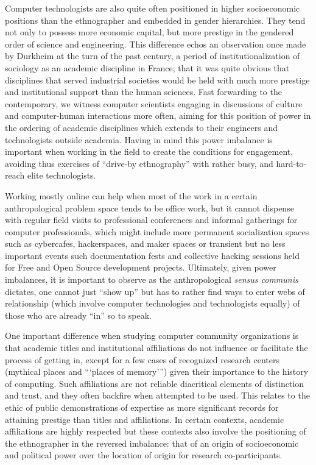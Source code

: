 \documentclass[10pt,letter,oneside]{scrartcl}
\begin{document}
Computer technologists are also quite often positioned in higher
socioeconomic positions than the ethnographer and embedded in gender
hierarchies. They tend not only to possess more economic capital, but 
more prestige in the gendered order of science and engineering. This 
difference echos an observation once made by Durkheim at the turn of 
the past century, a period of institutionalization of sociology as an 
academic discipline in France, that it was quite obvious that disciplines
that served industrial societies would be held with much more prestige 
and institutional support than the human sciences. Fast forwarding to 
the contemporary, we witness computer scientists engaging in discussions
of culture and computer-human interactions more often,  aiming for 
this position of power in the ordering of academic disciplines which 
extends to their engineers and technologists outside academia. Having in 
mind this power imbalance is important when working in the field to create
the conditions for engagement, avoiding thus exercises of 
``drive-by ethnography'' with rather busy, and hard-to-reach elite 
technologists.

Working mostly online can help when most of the work in a certain
anthropological problem space tends to be office work, but it cannot
dispense with regular field visits to professional conferences and
informal gatherings for computer professionals, which might include
more permanent socialization spaces such as cybercafes,
hackerspaces, and maker spaces or transient but no less important
events such documentation fests and collective hacking sessions held
for Free and Open Source development projects. Ultimately, given
power imbalances, it is important to observe as the anthropological
\emph{sensus communis} dictates, one cannot just ``show up'' but has
to rather find ways to enter webs of relationship (which involve
computer technologies and technologists equally) of those who are
already ``in'' so to speak.

One important difference when studying computer community
organizations is that academic titles and institutional affiliations
do not influence or facilitate the process of getting in, except for
a few cases of recognized research centers (mythical places and ```places
of memory''') given their importance to the history of computing. Such 
affiliations are not reliable diacritical elements of distinction and 
trust, and they often backfire when attempted to be used.  This relates 
to the ethic of public demonstrations of expertise as more significant
records for attaining prestige than titles and affiliations. In certain 
contexts, academic affiliations are highly respected but these 
contexts also involve the positioning of the ethnographer in the reversed 
imbalance: that of an origin of socioeconomic and political power over 
the location of origin for research co-participants.
\end{document}
